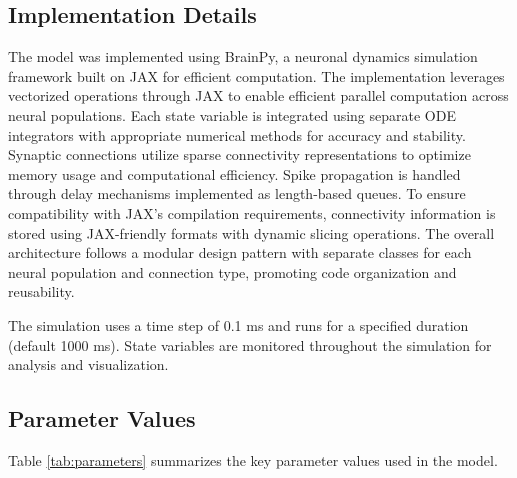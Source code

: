 \subsection{Implementation Details}

The model was implemented using BrainPy, a neuronal dynamics simulation framework built on JAX for efficient computation. The implementation leverages vectorized operations through JAX to enable efficient parallel computation across neural populations. Each state variable is integrated using separate ODE integrators with appropriate numerical methods for accuracy and stability. Synaptic connections utilize sparse connectivity representations to optimize memory usage and computational efficiency. Spike propagation is handled through delay mechanisms implemented as length-based queues. To ensure compatibility with JAX's compilation requirements, connectivity information is stored using JAX-friendly formats with dynamic slicing operations. The overall architecture follows a modular design pattern with separate classes for each neural population and connection type, promoting code organization and reusability.

The simulation uses a time step of 0.1 ms and runs for a specified duration (default 1000 ms). State variables are monitored throughout the simulation for analysis and visualization.

\subsection{Parameter Values}

Table \ref{tab:parameters} summarizes the key parameter values used in the model.

